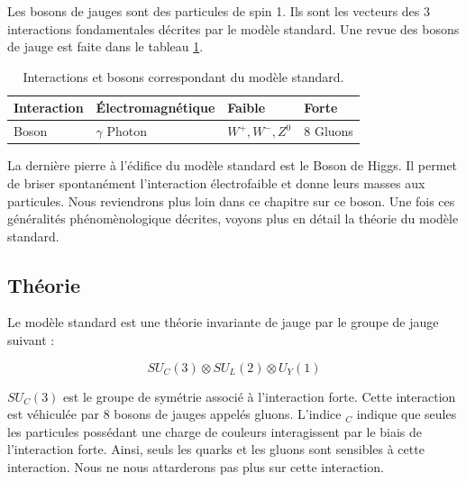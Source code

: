 Les bosons de jauges sont des particules de spin 1. Ils sont les vecteurs des 3 
interactions fondamentales d\'ecrites par le mod\`ele standard. Une revue des 
bosons de jauge est faite dans le tableau \ref{tab:bosons}. 

\begin{table}[h]
\begin{center}
\begin{tabular}[t]{|l|l|l|l|} \hline
 Interaction & \'Electromagn\'etique & Faible          & Forte    \\ \hline
 Boson       & $\gamma$ Photon     & $W^+, W^-, Z^0$ & 8 Gluons \\ \hline
\end{tabular}
\caption{Interactions et bosons correspondant du mod\`ele standard.}
\label{tab:bosons}
\end{center}
\end{table}

\medskip

La derni\`ere pierre \`a l'\'edifice du mod\`ele standard est le Boson de 
Higgs. Il permet de briser spontan\'ement l'interaction \'electrofaible et 
donne leurs masses aux particules. Nous reviendrons plus loin dans ce chapitre 
sur ce boson. Une fois ces g\'en\'eralit\'es ph\'enom\`enologique d\'ecrites, voyons plus en d\'etail la th\'eorie du mod\`ele standard.


\subsection{Th\'eorie}

Le mod\`ele standard est une th\'eorie invariante de jauge par le groupe de jauge suivant : 

\begin{equation} 
   SU_C(3) \otimes SU_L(2) \otimes U_Y(1) 
\end{equation}

$SU_C(3)$ est le groupe de sym\'etrie associ\'e \`a l'interaction forte. 
Cette interaction est v\'ehicul\'ee par 8 bosons de jauges appel\'es gluons. 
L'indice $_C$ indique que seules les particules poss\'edant une charge de 
couleurs interagissent par le biais de l'interaction forte. Ainsi, seuls les 
quarks et les gluons sont sensibles \`a cette interaction. Nous ne nous attarderons pas plus sur cette interaction. 

